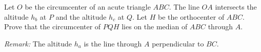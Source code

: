 Let $O$ be the circumcenter of an acute triangle $ABC$.
The line $OA$ intersects the altitude $h_b$ at $P$ and the altitude $h_c$ at $Q$.
Let $H$ be the orthocenter of $ABC$.
Prove that the circumcenter of $PQH$ lies on the median of $ABC$ through $A$.

\textit{Remark:} The altitude $h_a$ is the line through $A$ perpendicular to $BC$.
